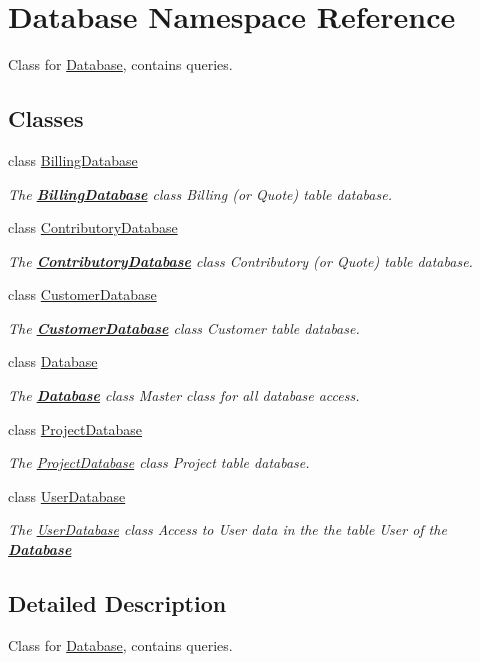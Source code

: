 \hypertarget{namespaceDatabase}{\section{Database Namespace Reference}
\label{namespaceDatabase}
}


Class for \hyperlink{namespaceDatabase}{Database}, contains queries.  


\subsection*{Classes}
\begin{DoxyCompactItemize}
\item 
class \hyperlink{classDatabase_1_1BillingDatabase}{Billing\+Database}
\begin{DoxyCompactList}\small\item\em The {\bfseries \hyperlink{classDatabase_1_1BillingDatabase}{Billing\+Database}} class Billing (or Quote) table database. \end{DoxyCompactList}\item 
class \hyperlink{classDatabase_1_1ContributoryDatabase}{Contributory\+Database}
\begin{DoxyCompactList}\small\item\em The {\bfseries \hyperlink{classDatabase_1_1ContributoryDatabase}{Contributory\+Database}} class Contributory (or Quote) table database. \end{DoxyCompactList}\item 
class \hyperlink{classDatabase_1_1CustomerDatabase}{Customer\+Database}
\begin{DoxyCompactList}\small\item\em The {\bfseries \hyperlink{classDatabase_1_1CustomerDatabase}{Customer\+Database}} class Customer table database. \end{DoxyCompactList}\item 
class \hyperlink{classDatabase_1_1Database}{Database}
\begin{DoxyCompactList}\small\item\em The {\bfseries \hyperlink{classDatabase_1_1Database}{Database}} class Master class for all database access. \end{DoxyCompactList}\item 
class \hyperlink{classDatabase_1_1ProjectDatabase}{Project\+Database}
\begin{DoxyCompactList}\small\item\em The \hyperlink{classDatabase_1_1ProjectDatabase}{Project\+Database} class Project table database. \end{DoxyCompactList}\item 
class \hyperlink{classDatabase_1_1UserDatabase}{User\+Database}
\begin{DoxyCompactList}\small\item\em The \hyperlink{classDatabase_1_1UserDatabase}{User\+Database} class Access to User data in the the table User of the {\bfseries \hyperlink{classDatabase_1_1Database}{Database}} \end{DoxyCompactList}\end{DoxyCompactItemize}


\subsection{Detailed Description}
Class for \hyperlink{namespaceDatabase}{Database}, contains queries. 